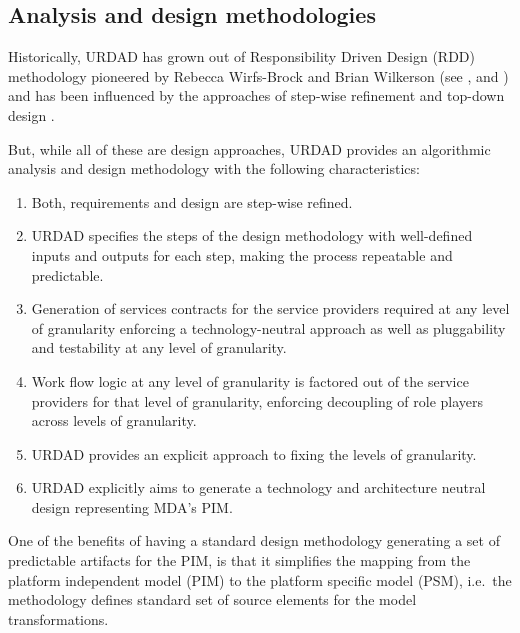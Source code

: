 
\subsection{Analysis and design methodologies}

Historically, URDAD has grown out of Responsibility Driven Design (RDD)
methodology pioneered by Rebecca Wirfs-Brock and Brian Wilkerson (see
\cite{wirfs-brock:responsibilityDrivenApproach},  and
\cite{wirfs-brock:objectDesign} \cite{wirfs-brock:designSimplicity}) and has
been influenced by the approaches of step-wise refinement \cite{wirth:stepWiseRefinement}
and top-down design \cite{martin:agileSoftwareDevelopment}.

But, while all of these are design approaches, URDAD provides an algorithmic
analysis and design methodology with the following characteristics:
\begin{enumerate}
  \item Both, requirements and design are step-wise refined.
  \item URDAD specifies the steps of the design methodology with
			well-defined inputs and outputs for each step, making the process repeatable
			and predictable.
  \item Generation of services contracts for the service providers required at any
			level of granularity enforcing a technology-neutral approach as well as
			pluggability and testability at any level of	granularity.
	\item Work flow logic at any level of granularity is factored out of the service
			providers for that level of granularity, enforcing decoupling of role players
			across levels of granularity.
	\item URDAD provides an explicit approach to fixing the levels of granularity.
   \item URDAD explicitly aims to generate a technology and architecture neutral design
			representing MDA's PIM.
\end{enumerate}

One of the benefits of having a standard design methodology generating a set of
predictable artifacts for the PIM, is that it simplifies the mapping from the platform
independent model (PIM) to the platform specific model (PSM), i.e.\ the methodology defines
standard set of source elements for the model transformations.



